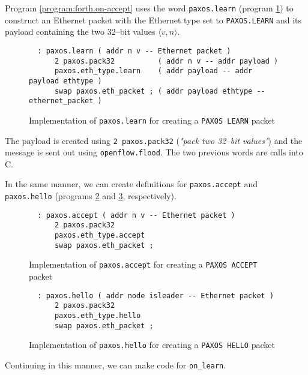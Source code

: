 Program \ref{program:forth.on-accept} 
uses the word \texttt{paxos.learn} (program \ref{program:forth.paxos.learn})
to construct an Ethernet packet with the
Ethernet type set to \texttt{PAXOS.LEARN} and its payload containing the two
32--bit values $\langle v, n \rangle$.

\begin{figure}[H]
  \centering
  \begin{Verbatim}
  : paxos.learn ( addr n v -- Ethernet packet )
      2 paxos.pack32          ( addr n v -- addr payload )
      paxos.eth_type.learn    ( addr payload -- addr payload ethtype )
      swap paxos.eth_packet ; ( addr payload ethtype -- ethernet_packet )
  \end{Verbatim}
  \caption{Implementation of \texttt{paxos.learn} for creating a
    \texttt{PAXOS LEARN} packet}
  \label{program:forth.paxos.learn}
\end{figure}

The payload is created using
\texttt{2 paxos.pack32} (\textit{"pack two 32--bit values"}) and the message
is sent out using \texttt{openflow.flood}.  The two previous words are calls
into C.

In the same manner, we can create definitions for \texttt{paxos.accept} and
\texttt{paxos.hello} (programs \ref{program:forth.paxos.accept} and
\ref{program:forth.paxos.hello}, respectively).

\begin{figure}[H]
  \centering
  \begin{Verbatim}
  : paxos.accept ( addr n v -- Ethernet packet )
      2 paxos.pack32
      paxos.eth_type.accept
      swap paxos.eth_packet ;
  \end{Verbatim}
  \caption{Implementation of \texttt{paxos.accept} for creating a
    \texttt{PAXOS ACCEPT} packet}
  \label{program:forth.paxos.accept}
\end{figure}

\begin{figure}[H]
  \centering
  \begin{Verbatim}
  : paxos.hello ( addr node isleader -- Ethernet packet )
      2 paxos.pack32
      paxos.eth_type.hello
      swap paxos.eth_packet ;
  \end{Verbatim}
  \caption{Implementation of \texttt{paxos.hello} for creating a
    \texttt{PAXOS HELLO} packet}
  \label{program:forth.paxos.hello}
\end{figure}

Continuing in this manner, we can make code for \texttt{on\_{}learn}.

